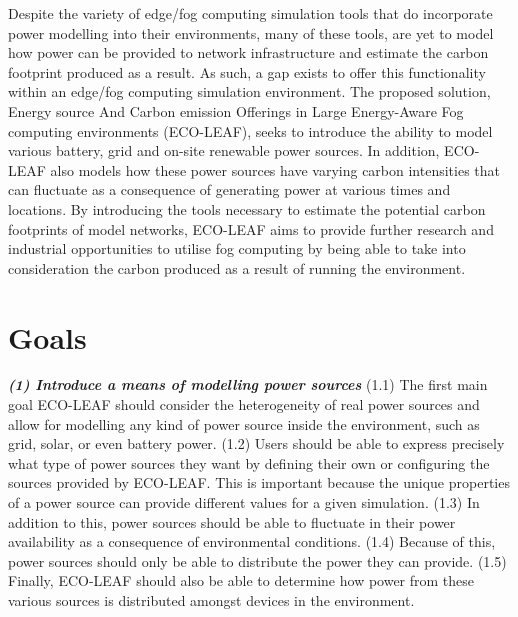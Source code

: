 \documentclass{l4proj}
\begin{document}
Despite the variety of edge/fog computing simulation tools that do incorporate power modelling into their environments, many of these tools, are yet to model how power can be provided to network infrastructure and estimate the carbon footprint produced as a result.
As such, a gap exists to offer this functionality within an edge/fog computing simulation environment.
The proposed solution, Energy source And Carbon emission Offerings in Large Energy-Aware Fog computing environments (ECO-LEAF), seeks to introduce the ability to model various battery, grid and on-site renewable power sources.
In addition, ECO-LEAF also models how these power sources have varying carbon intensities that can fluctuate as a consequence of generating power at various times and locations.
By introducing the tools necessary to estimate the potential carbon footprints of model networks, ECO-LEAF aims to provide further research and industrial opportunities to utilise fog computing by being able to take into consideration the carbon produced as a result of running the environment.


\section{Goals}\label{intro:subsec:goals}
\textbf{\textit{(1) Introduce a means of modelling power sources}}
(1.1) The first main goal ECO-LEAF should consider the heterogeneity of real power sources and allow for modelling any kind of power source inside the environment, such as grid, solar, or even battery power.
(1.2) Users should be able to express precisely what type of power sources they want by defining their own or configuring the sources provided by ECO-LEAF.
This is important because the unique properties of a power source can provide different values for a given simulation.
(1.3) In addition to this, power sources should be able to fluctuate in their power availability as a consequence of environmental conditions.
(1.4) Because of this, power sources should only be able to distribute the power they can provide.
(1.5) Finally, ECO-LEAF should also be able to determine how power from these various sources is distributed amongst devices in the environment.
\end{document}
